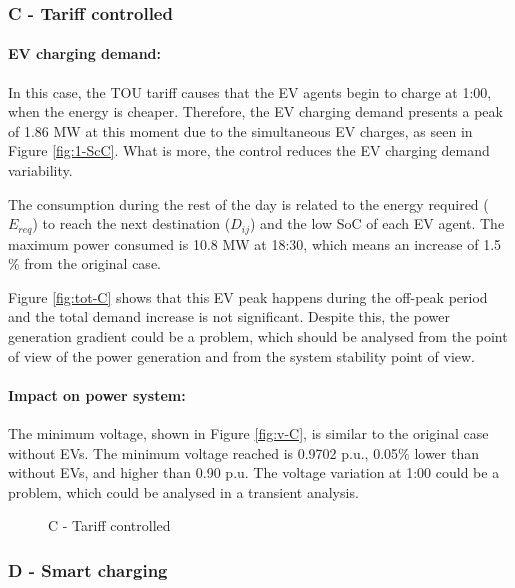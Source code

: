 \documentclass[a4paper,11pt,twoside,openright]{report}
\begin{document}
\subsubsection{C - Tariff controlled}

\paragraph{EV charging demand:}
In this case, the TOU tariff causes that the EV agents begin to charge at 1:00, when the energy is cheaper. Therefore, the EV charging demand presents a peak of 1.86 MW at this moment due to the simultaneous EV charges, as seen in Figure \ref{fig:1-ScC}. What is more, the control reduces the EV charging demand variability.

The consumption during the rest of the day is related to the energy required ($E_{req}$) to reach the next destination ($D_{ij}$) and the low SoC of each EV agent. The maximum power consumed is 10.8 MW at 18:30, which means an increase of 1.5$\%$ from the original case.

Figure \ref{fig:tot-C} shows that this EV peak happens during the off-peak period and the total demand increase is not significant. Despite this, the power generation gradient could be a problem, which should be analysed from the point of view of the power generation and from the system stability point of view.

\paragraph{Impact on power system:}
The minimum voltage, shown in Figure \ref{fig:v-C}, is similar to the original case without EVs. The minimum voltage reached is 0.9702 p.u., 0.05$\%$ lower than without EVs, and higher than 0.90 p.u. The voltage variation at 1:00 could be a problem, which could be analysed in a transient analysis.
\begin{figure}[htbp]
	\centering
	\caption{C - Tariff controlled}
\end{figure}

\subsubsection{D - Smart charging}
\end{document}

